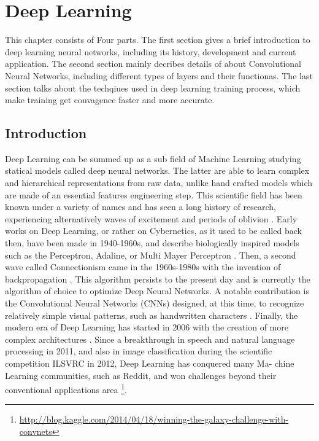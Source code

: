 \chapter{Deep Learning}
This chapter consists of Four parts. The first section gives a brief introduction to deep learning neural networks, including its history, development and current application. The second section mainly decribes details of about Convolutional Neural Networks, including different types of layers and their functionas. The last section talks about the techqiues used in deep learning training process, which make training get convagence faster and more accurate.  

\section{Introduction}
    Deep Learning can be summed up as a sub field of Machine Learning studying statical models called deep neural networks. The latter are able to learn complex and hierarchical representations from raw data, unlike hand crafted models which are made of an essential features engineering step. This scientific field has been known under a variety of names and has seen a long history of research, experiencing alternatively waves of excitement and periods of oblivion \cite{schmidhuber2015deep}. Early works on Deep Learning, or rather on Cybernetics, as it used to be called back then, have been made in 1940-1960s, and describe biologically inspired models such as the Perceptron, Adaline, or Multi Mayer Perceptron \cite{rosenblatt2000probabilistic,schmidhuber2015deep}. Then, a second wave called Connectionism came in the 1960s-1980s with the invention of backpropagation \cite{rumelhart1986learning}. This algorithm persists to the present day and is currently the algorithm of choice to optimize Deep Neural Networks. A notable contribution is the Convolutional Neural Networks (CNNs) designed, at this time, to recognize relatively simple visual patterns, such as handwritten characters \cite{lecun1995convolutional}. Finally, the modern era of Deep Learning has started in 2006 with the creation of more complex architectures \cite{hinton2006fast,bengio2007greedy,huang2007unsupervised}. Since a breakthrough in speech and natural language processing in 2011, and also in image classification during the scientific competition ILSVRC in 2012, Deep Learning has conquered many Ma- chine Learning communities, such as Reddit, and won challenges beyond their conventional applications area \footnote{\url{http://blog.kaggle.com/2014/04/18/winning-the-galaxy-challenge-with-convnets}}. \\

